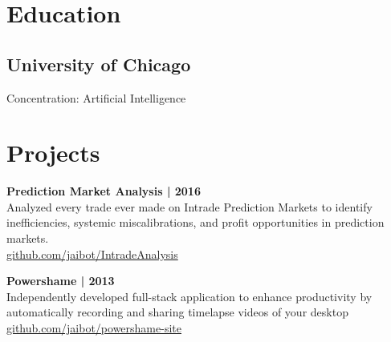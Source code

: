 \documentclass[]{resume}
\begin{document}
%
%
\lastupdated
\github

%
%

%
%

\begin{minipage}[t]{0.33\textwidth}


\section{Education}

\subsection{University of Chicago}
Concentration: Artificial Intelligence
\sectionsep


\section{Projects}

\textbf{Prediction Market Analysis | 2016}\\
Analyzed every trade ever made on Intrade Prediction Markets to identify
inefficiencies, systemic miscalibrations, and profit opportunities in prediction markets.\\
\href{http://github.com/jaibot/IntradeAnalysis}{github.com/jaibot/IntradeAnalysis }
\sectionsep

\textbf{Powershame | 2013} \\
Independently developed full-stack application to enhance productivity by
automatically recording and sharing timelapse videos of your desktop\\
\href{http://github.com/jaibot/powershame-site}{github.com/jaibot/powershame-site}
\sectionsep


\end{minipage}
\end{document}
